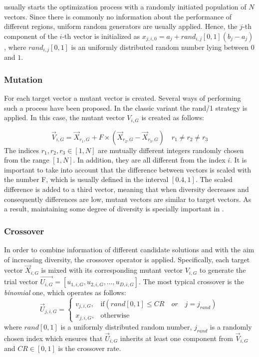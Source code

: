 \DE{} usually starts the optimization process with a randomly initiated population of $N$ vectors.
%
Since there is commonly no information about the performance of different regions, uniform random generators are usually applied.
%
Hence, the $j$-th component of the $i$-th vector is initialized as $x_{j,i,0} = a_{j} + rand_{i,j}[0,1] (b_{j} - a_{j})$,
where $rand_{i,j}[0,1]$ is an uniformly distributed random number lying between $0$ and $1$.

\subsubsection{Mutation}

For each target vector a mutant vector is created.
%
Several ways of performing
such a process have been proposed.
%
In the classic \DE{} variant the rand/1 strategy is applied.
%
In this case, the mutant vector $V_{i,G}$ is created as follows:

\begin{equation}\label{eqn:mutation}
\vec{V}_{i,G} = \vec{X}_{r_1, G} + F \times (\vec{X}_{r_2, G} - \vec{X}_{r_3, G}) \quad r_1 \neq r_2 \neq r_3
\end{equation}
%
The indices $r_1, r_2, r_3 \in [1,N]$ are mutually different integers randomly chosen from the range $[1, N]$.
%
In addition, they are all different from the index $i$.
%
It is important to take into account that the difference between vectors is scaled with the number F, which is usually defined in the interval $[0.4, 1]$.
%
The scaled difference is added to a third vector, meaning that
when diversity decreases and consequently differences are low, mutant vectors are similar to target vectors.
%
As a result, maintaining some degree of diversity is specially important in \DE{}.

\subsubsection{Crossover}

In order to combine information of different candidate solutions and with the aim of increasing diversity, the crossover
operator is applied.
%
Specifically, each target vector $\vec{X}_{i,G}$ is mixed with its corresponding mutant vector $V_{i,G}$ to 
generate the trial vector $\vec{U_{i,G}} = [u_{1,i,G},u_{2,i,G}, ..., u_{D,i,G} ]$.
%
The most typical crossover is the \textit{binomial} one, which operates as follows:
%
\begin{equation} \label{eqn:crossover}
\vec{U}_{j,i,G}= 
\begin{cases}
    v_{j,i,G},& \text{if} (rand[0,1] \leq CR \quad or \quad j = j_{rand}  )\\
    x_{j,i,G},              & \text{otherwise}
\end{cases}
\end{equation}
where $rand[0,1]$ is a uniformly distributed random number,
$j_{rand}$ is a randomly chosen index which ensures that $\vec{U}_{i,G}$ inherits at least one component from $\vec{V}_{i,G}$ and
$CR \in [0,1]$ is the crossover rate.


